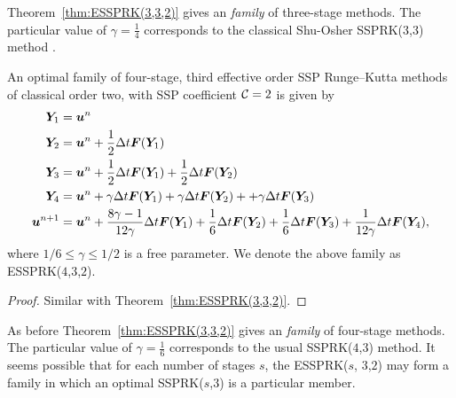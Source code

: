 Theorem~\ref{thm:ESSPRK(3,3,2)} gives an \emph{family} of three-stage methods.
The particular value of $\gamma = \frac{1}{4}$ corresponds to the
classical Shu-Osher SSPRK(3,3) method .  

\begin{theorem}\label{thm:ESSPRK(4,3,2)}
  An optimal family of four-stage, third effective order
  SSP Runge--Kutta methods of classical order two, with SSP
  coefficient $\mathcal{C}=2$ is given by
    \begin{displaymath}
        \begin{split}
            \bm{Y}_{1} &= \bm{u}^{n} \\
            \bm{Y}_{2} &= \bm{u}^{n} + \frac{1}{2}\Delta t\bm{F}(\bm{Y}_{1}) \\
            \bm{Y}_{3} &= \bm{u}^{n} + \frac{1}{2}\Delta t\bm{F}(\bm{Y}_{1}) + \frac{1}{2}\Delta t\bm{F}(\bm{Y}_{2}) \\
            \bm{Y}_{4} &= \bm{u}^{n} + \gamma\Delta t\bm{F}(\bm{Y}_{1}) + \gamma\Delta t\bm{F}(\bm{Y}_{2}) + + \gamma\Delta t\bm{F}(\bm{Y}_{3}) \\
            \bm{u}^{n+1} &= \bm{u}^{n} + \frac{8\gamma-1}{12\gamma}\Delta t\bm{F}(\bm{Y}_{1}) + \frac{1}{6}\Delta t\bm{F}(\bm{Y}_{2}) + \frac{1}{6}\Delta t\bm{F}(\bm{Y}_{3}) + \frac{1}{12\gamma}\Delta t\bm{F}(\bm{Y}_{4}),
        \end{split}
    \end{displaymath}
    where $ 1/6 \leq \gamma \leq 1/2 $ is a free parameter. We denote the above family as ESSPRK($4$,$3$,$2$).
\end{theorem}
\begin{proof}
	Similar with Theorem~\ref{thm:ESSPRK(3,3,2)}.
\end{proof}

As before Theorem~\ref{thm:ESSPRK(3,3,2)} gives an \emph{family} of four-stage methods.
The particular value of $\gamma = \frac{1}{6}$ corresponds to the usual SSPRK($4$,$3$) method.
It seems possible that for each number of stages $s$, the ESSPRK($s$, $3$,$2$) may form
a family in which an optimal SSPRK($s$,$3$) is a particular member. 


